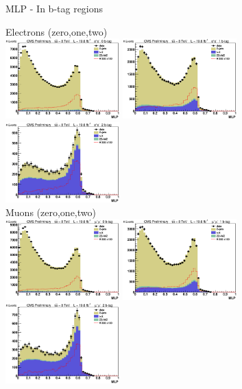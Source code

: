 \begin{frame}{MLP - In b-tag regions}
\begin{center}
Electrons (zero,one,two)\\
\includegraphics[width=0.33\textwidth]{images/preselection/0/el/MLP.eps}
\includegraphics[width=0.33\textwidth]{images/preselection/1/el/MLP.eps}
\includegraphics[width=0.33\textwidth]{images/preselection/2/el/MLP.eps}\\
Muons (zero,one,two)\\
\includegraphics[width=0.33\textwidth]{images/preselection/0/mu/MLP.eps}
\includegraphics[width=0.33\textwidth]{images/preselection/1/mu/MLP.eps}
\includegraphics[width=0.33\textwidth]{images/preselection/2/mu/MLP.eps}\\
\end{center}
\end{frame}

